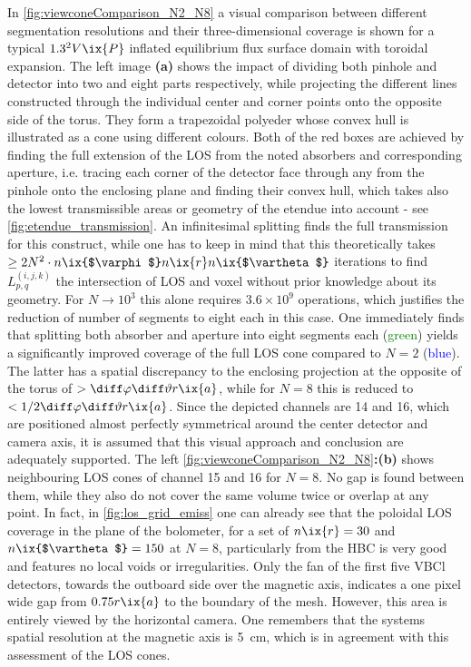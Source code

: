             In \cref{fig:viewconeComparison_N2_N8} a visual comparison between different segmentation resolutions and their three-dimensional coverage is shown for a typical $1.3^{2}V\ix{P}$ inflated equilibrium flux surface domain with toroidal expansion. The left image \textbf{(a)} shows the impact of dividing both pinhole and detector into two and eight parts respectively, while projecting the different lines constructed through the individual center and corner points onto the opposite side of the torus. They form a trapezoidal polyeder whose convex hull is illustrated as a cone using different colours. Both of the red boxes are achieved by finding the full extension of the LOS from the noted absorbers and corresponding aperture, i.e. tracing each corner of the detector face through any from the pinhole onto the enclosing plane and finding their convex hull, which takes also the lowest transmissible areas or geometry of the etendue into account - see \cref{fig:etendue_transmission}. An infinitesimal splitting finds the full transmission for this construct, while one has to keep in mind that this theoretically takes $\ge 2N^{2}\cdot n\ix{$\varphi$}n\ix{r}n\ix{$\vartheta$}$ iterations to find $L^{\left(i,j,k\right)}_{p,q}$ the intersection of LOS and voxel without prior knowledge about its geometry. For $N\rightarrow10^{3}$ this alone requires $3.6\times10^{9}$ operations, which justifies the reduction of number of segments to eight each in this case. One immediately finds that splitting both absorber and aperture into eight segments each (\textcolor{green}{green}) yields a significantly improved coverage of the full LOS cone compared to $N=2$ (\textcolor{blue}{blue}). The latter has a spatial discrepancy to the enclosing projection at the opposite of the torus of $>\diff\varphi\diff\vartheta r\ix{a}$, while for $N=8$ this is reduced to $<1/2\diff\varphi\diff\vartheta r\ix{a}$. Since the depicted channels are 14 and 16, which are positioned almost perfectly symmetrical around the center detector and camera axis, it is assumed that this visual approach and conclusion are adequately supported. The left \cref{fig:viewconeComparison_N2_N8}\textbf{:(b)} shows neighbouring LOS cones of channel 15 and 16 for $N=8$. No gap is found between them, while they also do not cover the same volume twice or overlap at any point. In fact, in \cref{fig:los_grid_emiss} one can already see that the poloidal LOS coverage in the plane of the bolometer, for a set of $n\ix{r}=30$ and $n\ix{$\vartheta$}=150$ at $N=8$, particularly from the HBC is very good and features no local voids or irregularities. Only the fan of the first five VBCl detectors, towards the outboard side over the magnetic axis, indicates a one pixel wide gap from $0.75r\ix{a}$ to the boundary of the mesh. However, this area is entirely viewed by the horizontal camera. One remembers that the systems spatial resolution at the magnetic axis is \SI{5}{\centi\meter}, which is in agreement with this assessment of the LOS cones.\\%
